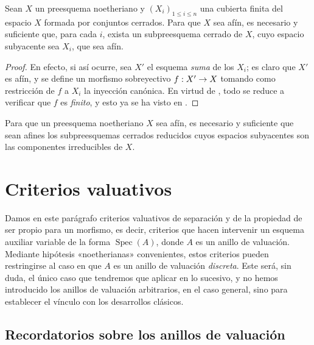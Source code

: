 \documentclass[oneside,10pt]{amsart}
\makeatletter
\renewcommand{\leq}{\leqslant}
\newcommand{\ega@arrow}[2]{\mathchoice{#1}{#2}{#2}{#2}}
\renewcommand{\to}{\ega@arrow{\longrightarrow}{\rightarrow}}
\let\EGAOriginalLabel\label
\renewcommand{\label}[1]{\phantomsection\EGAOriginalLabel{#1}}
\makeatother
\begin{document}
\begin{corollary}[6.7.2]
\label{II.6.7.2-fr}
Sean $X$ un preesquema noetheriano y $(X_i)_{1\leq i\leq n}$ una cubierta finita del espacio $X$ formada por conjuntos cerrados.
Para que $X$ sea afín, es necesario y suficiente que, para cada $i$, exista un subpreesquema cerrado de $X$, cuyo espacio subyacente sea $X_i$, que sea afín.
\end{corollary}

\begin{proof}
En efecto, si así ocurre, sea $X'$ el esquema \emph{suma} de los $X_i$;
es claro que $X'$ es afín, y se define un morfismo sobreyectivo $f:X'\to X$ tomando como restricción de $f$ a $X_i$ la inyección canónica.
En virtud de , todo se reduce a verificar que $f$ es \emph{finito}, y esto ya se ha visto en .
\end{proof}

\begin{corollary}[6.7.3]
\label{II.6.7.3-fr}
Para que un preesquema noetheriano $X$ sea afín, es necesario y suficiente que sean afines los subpreesquemas cerrados reducidos cuyos espacios subyacentes son las componentes irreducibles de $X$.
\end{corollary}

\section{Criterios valuativos}
\label{section:II.7-fr}

Damos en este parágrafo criterios valuativos de separación y de la propiedad de ser propio para un morfismo, es decir, criterios que hacen intervenir un esquema auxiliar variable de la forma $\operatorname{Spec}(A)$, donde $A$ es un anillo de valuación.
Mediante hipótesis «noetherianas» convenientes, estos criterios pueden restringirse al caso en que $A$ es un anillo de valuación \emph{discreta}.
Este será, sin duda, el único caso que tendremos que aplicar en lo sucesivo, y no hemos introducido los anillos de valuación arbitrarios, en el caso general, sino para establecer el vínculo con los desarrollos clásicos.

\subsection{Recordatorios sobre los anillos de valuación}
\label{subsection:II.7.1-fr}
\end{document}
